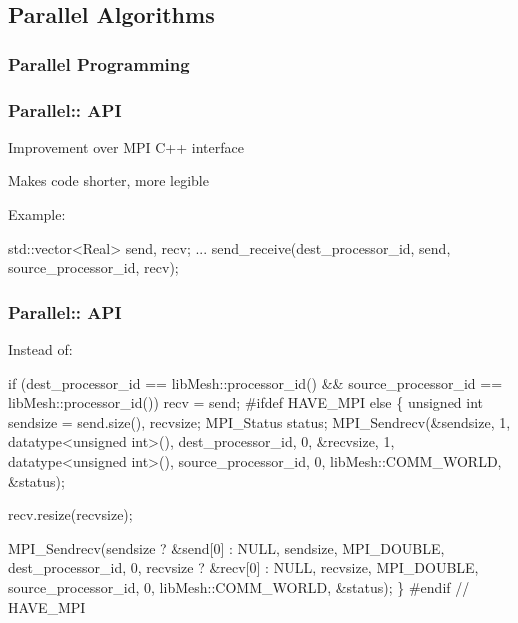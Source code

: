 \subsection{Parallel Algorithms}
\subsubsection{Parallel Programming}
\begin{frame}[fragile]
\frametitle{Parallel:: API}
\item Improvement over MPI C++ interface
\item Makes code shorter, more legible
\royitemizeend

Example:
\small
\begin{semiverbatim}
std::vector<Real> send, recv;
...
send\_receive(dest\_processor\_id, send,
             source\_processor\_id, recv);
\end{semiverbatim}
\end{frame}



\begin{frame}[fragile]
\frametitle{Parallel:: API}

Instead of:
\tiny
\begin{semiverbatim}
if (dest\_processor\_id   == libMesh::processor\_id() \&\&
    source\_processor\_id == libMesh::processor\_id())
  recv = send;
#ifdef HAVE\_MPI
else
  \{
    unsigned int sendsize = send.size(), recvsize;
    MPI\_Status status;
    MPI\_Sendrecv(\&sendsize, 1, datatype<unsigned int>(),
                 dest\_processor\_id, 0,
                 \&recvsize, 1, datatype<unsigned int>(),
                 source\_processor\_id, 0,
                 libMesh::COMM\_WORLD,
                 \&status);

    recv.resize(recvsize);

    MPI\_Sendrecv(sendsize ? \&send[0] : NULL, sendsize, MPI\_DOUBLE,
                 dest\_processor\_id, 0,
                 recvsize ? \&recv[0] : NULL, recvsize, MPI\_DOUBLE,
                 source\_processor\_id, 0,
                 libMesh::COMM\_WORLD,
                 \&status);
  \}
#endif // HAVE\_MPI
\end{semiverbatim}
\end{frame}


